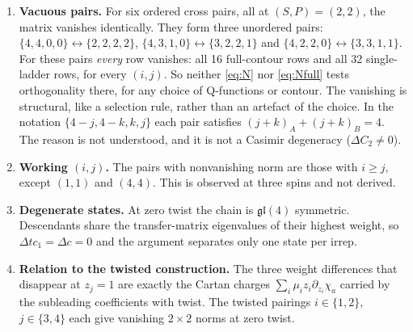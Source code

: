 \documentclass[11pt]{article}
\begin{document}
\begin{enumerate}
\item \textbf{Vacuous pairs.} For six ordered cross pairs, all at $(S,P)=(2,2)$, the matrix
vanishes identically. They form three unordered pairs:
$\{4,4,0,0\}\leftrightarrow\{2,2,2,2\}$, $\{4,3,1,0\}\leftrightarrow\{3,2,2,1\}$ and
$\{4,2,2,0\}\leftrightarrow\{3,3,1,1\}$. For these pairs \emph{every} row vanishes: all 16
full-contour rows and all 32 single-ladder rows, for every $(i,j)$. So neither \eqref{eq:N} nor
\eqref{eq:Nfull} tests orthogonality there, for any choice of Q-functions or contour. The vanishing
is structural, like a selection rule, rather than an artefact of the choice. In the notation
$\{4-j,4-k,k,j\}$ each pair satisfies $(j+k)_A+(j+k)_B=4$. The reason is not understood, and it is
not a Casimir degeneracy ($\Delta C_2\neq0$).
\item \textbf{Working $(i,j)$.} The pairs with nonvanishing norm are those with $i\ge j$, except
$(1,1)$ and $(4,4)$. This is observed at three spins and not derived.
\item \textbf{Degenerate states.} At zero twist the chain is $\mathfrak{gl}(4)$ symmetric.
Descendants share the transfer-matrix eigenvalues of their highest weight, so $\Delta tc_1=\Delta c=0$
and the argument separates only one state per irrep.
\item \textbf{Relation to the twisted construction.} The three weight differences that disappear
at $z_j=1$ are exactly the Cartan charges $\sum_i\mu_i z_i\partial_{z_i}\chi_a$ carried by the
subleading coefficients with twist. The twisted pairings $i\in\{1,2\}$, $j\in\{3,4\}$ each give
vanishing $2\times2$ norms at zero twist.
\end{enumerate}
\end{document}
